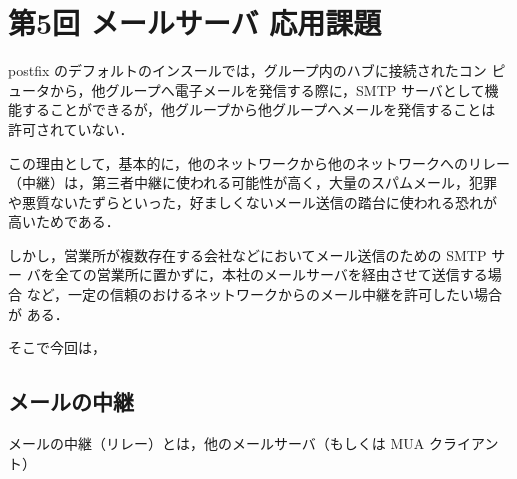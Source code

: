 \section{第5回 メールサーバ 応用課題}

postfix のデフォルトのインスールでは，グループ内のハブに接続されたコン
ピュータから，他グループへ電子メールを発信する際に，SMTP サーバとして機
能することができるが，他グループから他グループへメールを発信することは
許可されていない．

この理由として，基本的に，他のネットワークから他のネットワークへのリレー
（中継）は，第三者中継に使われる可能性が高く，大量のスパムメール，犯罪
や悪質ないたずらといった，好ましくないメール送信の踏台に使われる恐れが
高いためである．

しかし，営業所が複数存在する会社などにおいてメール送信のための SMTP サー
バを全ての営業所に置かずに，本社のメールサーバを経由させて送信する場合
など，一定の信頼のおけるネットワークからのメール中継を許可したい場合が
ある．

そこで今回は，

\subsection*{メールの中継}

メールの中継（リレー）とは，他のメールサーバ（もしくは MUA クライアント）